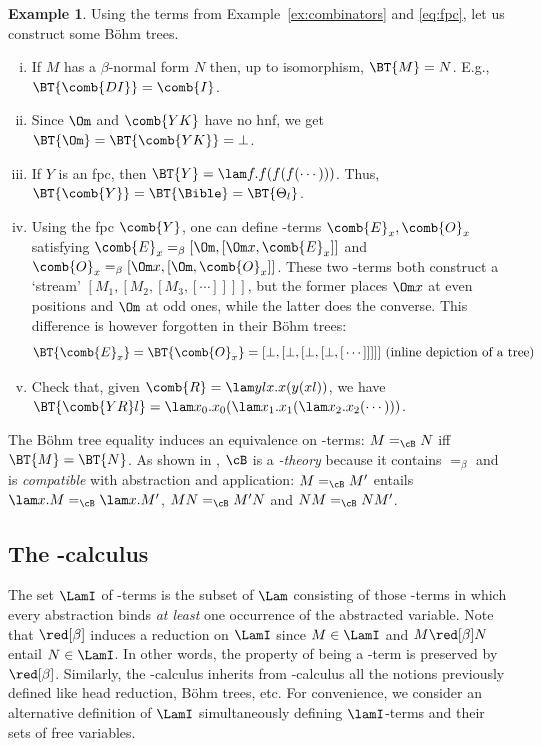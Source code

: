 \documentclass[10pt,a4paper]{amsart}
\theoremstyle{definition}
\newtheorem{example}[theorem]{Example}
\newcommand{\bsub}{\begin{enumerate}[(i)]}
\newcommand{\esub}{\end{enumerate}}
\begin{document}
\begin{example}\label{ex:BTs} 
Using the terms from Example~\ref{ex:combinators} and \eqref{eq:fpc}, let us construct some Böhm trees.
\bsub
\item If $M$ has a $\beta$-normal form $N$ then, up to isomorphism, $\BT{M} = N$. E.g., $\BT{\comb{DI}} = \comb{I}$.
\item Since $\Om$ and $\comb{YK}$ have no hnf, we get $\BT{\Om} = \BT{\comb{YK}} = \bot$.
\item If $Y$ is an fpc, then $\BT{Y} = \lam f.f(f(f(\cdots)))$. Thus, $\BT{\comb{Y}} = \BT{\Bible} = \BT{\Theta_l}$.
\item\label{ex:BTs4} 
	Using the fpc $\comb{Y}$, one can define \lam-terms $\comb{E}_x,\comb{O}_x$ satisfying
	$\comb{E}_x =_\beta {[}\Om, [\Om x, \comb{E}_x]]$ and 
	$\comb{O}_x =_\beta {[}\Om x, [\Om, \comb{O}_x]]$. 
These two \lam-terms both construct a `stream' $[M_1,[M_2,[M_3,[\cdots]]]]$, but the former places $\Om x$ at even positions and $\Om$ at odd ones, while the latter does the converse.
This difference is however forgotten in their Böhm trees:
\[
	\BT{\comb{E}_x} = \BT{\comb{O}_x} = [\bot,[\bot,[\bot,[\bot,[\,\cdots]]]]]\hfill\textrm{ (inline depiction of a tree)}
\]
\item Check that, given $\comb{R} = \lam ylx.x(y(xl))$, we have $\BT{\comb{YR}l} = \lam x_0.x_0(\lam x_1.x_1(\lam x_2.x_2(\cdots)))$.
\esub
\end{example}

The B\"ohm tree equality induces an equivalence on \lam-terms: $M =_\cB N$ iff $\BT{M} = \BT{N}$. 
As shown in \cite{Levy76,Wadsworth78}, $\cB$ is a \emph{\lam-theory} because it contains $=_\beta$ and is \emph{compatible} with abstraction and application: $M =_\cB M'$ entails $\lam x.M =_\cB \lam x.M'$, $MN =_\cB M'N$ and $NM =_\cB NM'$.

\subsection{The \lamI-calculus}\label{ssec:lamI}

The set $\LamI$ of \lamI-terms is the subset of $\Lam$ consisting of those \lam-terms 
in which every abstraction binds \emph{at least} one occurrence of the abstracted variable.
Note that  $\red[\beta]$ induces a reduction on $\LamI$ since $M\in\LamI$ and $M \red[\beta] N$ entail $N\in\LamI$. 
In other words, the property of being a \lamI-term is preserved by $\red[\beta]$.
Similarly, the \lamI-calculus inherits from \lam-calculus all the notions previously defined like head reduction, Böhm trees, etc.
For convenience, we consider an alternative definition of $\LamI$ simultaneously defining $\lamI$-terms and their sets of free variables.
\end{document}
